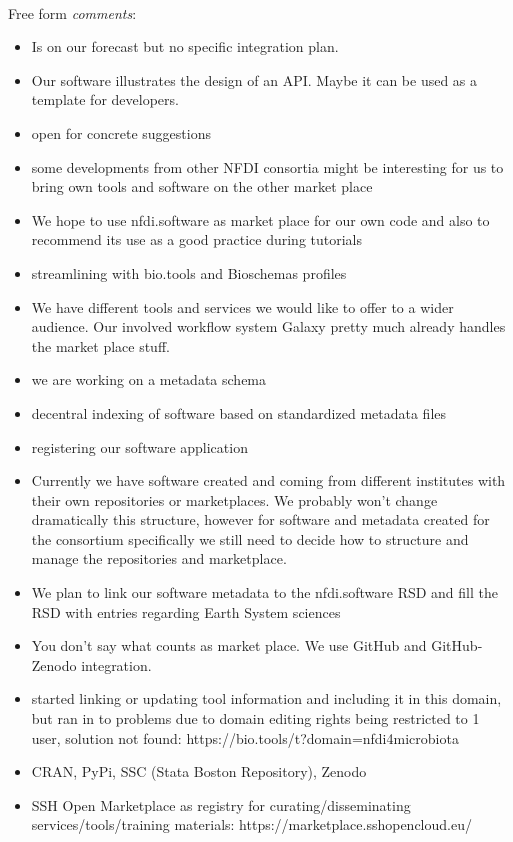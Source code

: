 \documentclass[headsepline,titlepage,twoside,12pt,toc=flat,headings=normal]{scrreprt}
\begin{document}
\paragraph{}
Free form \emph{comments}:
\begin{itemize}
\item Is on our forecast but no specific integration plan.
\item Our software illustrates the design of an API. Maybe it can be used as a template for developers.
\item open for concrete suggestions
\item some developments from other NFDI consortia might be interesting for us to bring own tools and software on the other market place
\item We hope to use nfdi.software as market place for our own code and also to recommend its use as a good practice during tutorials
\item streamlining with bio.tools and Bioschemas profiles
\item We have different tools and services we would like to offer to a wider audience. Our involved workflow system Galaxy pretty much already handles the market place stuff.
\item we are working on a metadata schema
\item decentral indexing of software based on standardized metadata files
\item registering our software application 
\item Currently we have software created and coming from different institutes with their own repositories or marketplaces. We probably won't change dramatically this structure, however for software and metadata created for the consortium specifically we still need to decide how to structure and manage the repositories and marketplace.
\item We plan to link our software metadata to the nfdi.software RSD and fill the RSD with entries regarding Earth System sciences
\item You don't say what counts as market place. We use GitHub and GitHub-Zenodo integration.
\item started linking or updating tool information and including it in this domain, but ran in to problems due to domain editing rights being restricted to 1 user, solution not found: https://bio.tools/t?domain=nfdi4microbiota 
\item CRAN, PyPi, SSC (Stata Boston Repository), Zenodo
\item SSH Open Marketplace as registry for curating/disseminating services/tools/training materials: https://marketplace.sshopencloud.eu/

\end{itemize}
\end{document}
